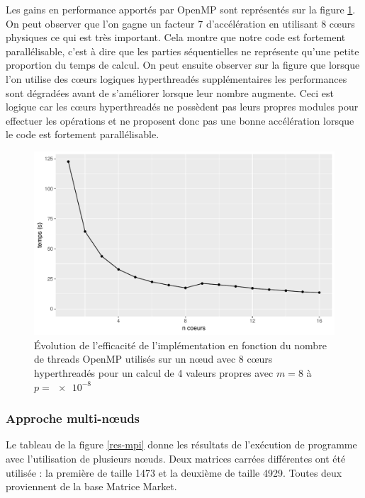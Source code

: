 \documentclass[11pt,a4paper]{article}
\begin{document}
			Les gains en performance apportés par OpenMP sont représentés sur la figure \ref{fig:omp_perf}. On peut observer que l'on gagne un facteur 7 d'accélération en utilisant 8 cœurs physiques ce qui est très important. Cela montre que notre code est fortement parallélisable, c'est à dire que les parties séquentielles ne représente qu'une petite proportion du temps de calcul. On peut ensuite observer sur la figure que lorsque l'on utilise des cœurs logiques hyperthreadés supplémentaires les performances sont dégradées avant de s'améliorer lorsque leur nombre augmente. Ceci est logique car les cœurs hyperthreadés ne possèdent pas leurs propres modules pour effectuer les opérations et ne proposent donc pas une bonne accélération lorsque le code est fortement parallélisable.

			\begin{figure}
				\includegraphics[width=\linewidth]{plots/omp_perf.pdf}
				\caption{Évolution de l'efficacité de l'implémentation en fonction du nombre de threads OpenMP utilisés sur un nœud avec 8 cœurs hyperthreadés pour un calcul de 4 valeurs propres avec $m = 8$ à $p=\SI{e-8}{}$ \label{fig:omp_perf}}
			\end{figure}

		\subsubsection{Approche multi-n\oe{}uds}

			Le tableau de la figure \ref{res-mpi} donne les résultats de l'exécution de programme avec l'utilisation de plusieurs n\oe{}uds. Deux matrices carrées différentes ont été utilisée : la première de taille 1473 et la deuxième de taille 4929. Toutes deux proviennent de la base Matrice Market.
\end{document}
